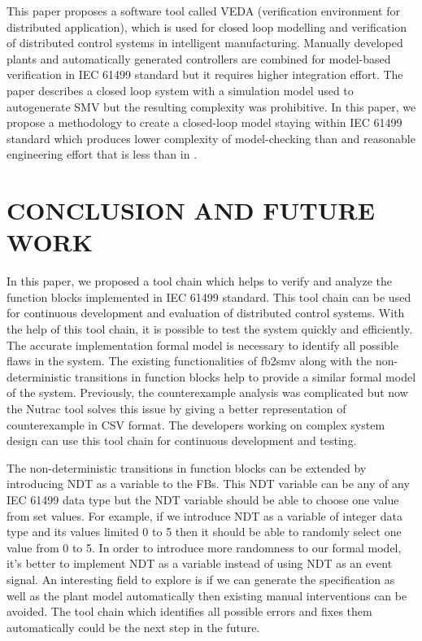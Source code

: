\documentclass[conference]{IEEEtran}
\begin{document}
This paper \cite{vyatkin2003verification} proposes  a software tool called VEDA (verification environment for distributed application), which is used for closed loop modelling and verification of distributed  control systems in intelligent manufacturing. Manually developed plants and automatically generated controllers are combined for model-based verification in IEC 61499 standard but it requires higher integration effort. The  paper \cite{Time-AwareComputations1} \cite{Time-AwareComputations2} describes a closed loop system with a simulation model used to autogenerate SMV but the resulting complexity was prohibitive. In this paper, we propose a methodology to create a closed-loop model staying within IEC 61499 standard which produces  lower complexity of model-checking than \cite{Time-AwareComputations1} \cite{Time-AwareComputations2} and reasonable engineering effort that is less than in \cite{vyatkin2003verification}.  

\section{CONCLUSION AND FUTURE WORK}


In this paper, we proposed a tool chain which helps to verify and analyze the function blocks implemented in IEC 61499 standard.  This tool chain can be used for continuous development and evaluation of distributed control systems.  With the help of this tool chain,  it is possible to test the system quickly and efficiently. The accurate implementation formal model is necessary to identify all possible flaws in the system.  The existing functionalities of fb2smv along with the non-deterministic transitions in function blocks help to provide a similar formal model of the system.  Previously, the counterexample  analysis was complicated but now the Nutrac tool solves this issue by giving  a better representation of counterexample in CSV format. The developers working on complex system design can use this tool chain for continuous development and testing.


The non-deterministic transitions  in function blocks can be extended by introducing NDT as a variable to the FBs. This NDT variable can be any of any IEC 61499 data type but the NDT variable should be able to choose one value from set values.  For example, if we introduce NDT as a variable of integer data type and its values  limited 0 to 5 then it should be able to randomly select one value from 0 to 5.  In order to introduce more randomness to our formal model, it's better to implement NDT as a variable instead of using NDT as an event signal.  An interesting field to explore is if we can generate  the specification as well as the plant model automatically then existing manual interventions can be avoided. The tool chain which identifies all possible errors and fixes them automatically could be the next step in the future.
\end{document}
